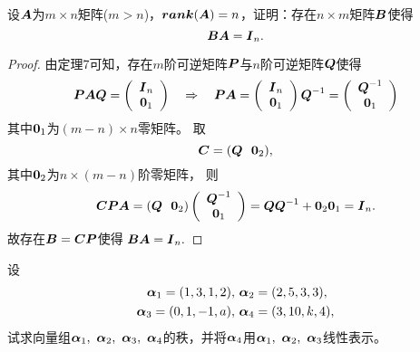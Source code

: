 \begin{frame}
\begin{li}
  设$\boldsymbol{A}$为$m\times n$矩阵($m>n$)，$\boldsymbol{rank}(\boldsymbol{A})=n$，证明：存在$n\times m$矩阵$\boldsymbol{B}$使得
  $$
  \boldsymbol{B}\boldsymbol{A}=\boldsymbol{I}_n.
  $$
\end{li}\pause 
\begin{proof}
由定理7可知，存在$m$阶可逆矩阵$\boldsymbol{P}$与$n$阶可逆矩阵$\boldsymbol{Q}$使得
$$
\MP\MA\MQ=\left(
  \begin{array}{c}
    \MI_n\\
    \M0_1
  \end{array}
\right)     
~~~\Rightarrow~~~
\MP\MA=\left(
  \begin{array}{c}
    \MI_n\\
    \M0_1
  \end{array}
\right)\MQ^{-1}=\left(
  \begin{array}{c}
    \MQ^{-1}\\
    \M0_1
  \end{array}
\right)
$$
其中$\M0_1$为$(m-n)\times n$零矩阵。
取
$$
\MC=(\MQ~~\M0_2),
$$
其中$\M0_2$为$n\times(m-n)$阶零矩阵， 则
$$
\MC\MP\MA=(\MQ~~\M0_2)\left(
  \begin{array}{c}
    \MQ^{-1}\\
    \M0_1
  \end{array}
\right)=\MQ\MQ^{-1}+\M0_2\M0_1=\MI_n.
$$ 
故存在$\boldsymbol{B}=\boldsymbol{C}\boldsymbol{P}$使得
$
\boldsymbol{B}\boldsymbol{A}=\boldsymbol{I}_n.
$
\end{proof}
\end{frame}

\begin{frame}
\begin{li}
  设
  $$
  \begin{aligned}
    \boldsymbol{\alpha}_1=(1,3,1,2), &~\boldsymbol{\alpha}_2=(2,5,3,3), \\
    \boldsymbol{\alpha}_3=(0,1,-1,a),& ~\boldsymbol{\alpha}_4=(3,10,k,4),
  \end{aligned}
  $$
  试求向量组$\boldsymbol{\alpha}_1,~\boldsymbol{\alpha}_2,~\boldsymbol{\alpha}_3,~\boldsymbol{\alpha}_4$的秩，并将$\boldsymbol{\alpha}_4$用$\boldsymbol{\alpha}_1,~\boldsymbol{\alpha}_2,~\boldsymbol{\alpha}_3$线性表示。
\end{li}
\end{frame}

